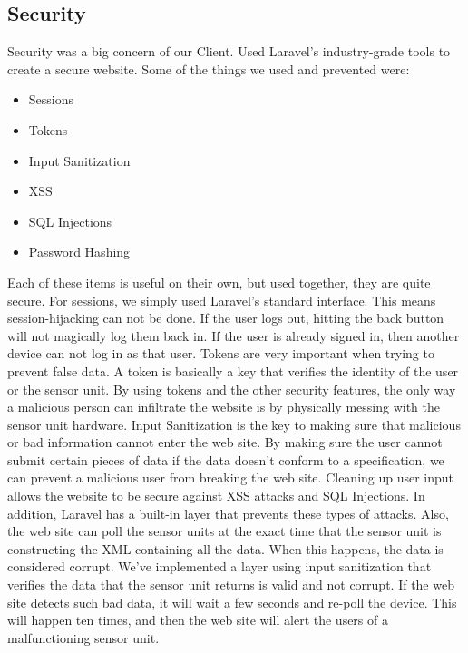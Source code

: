 \documentclass{report}
\begin{document}
\subsection*{Security}
\indent
\indent
Security was a big concern of our Client. Used Laravel's industry-grade tools to create a secure website. Some of the things we used and prevented were:
\begin{itemize}
	\item Sessions
	\item Tokens
	\item Input Sanitization
	\item XSS
	\item SQL Injections
	\item Password Hashing
\end{itemize}
\indent
Each of these items is useful on their own, but used together, they are quite secure.
\newline
\indent
For sessions, we simply used Laravel's standard interface. This means session-hijacking can not be done. If the user logs out, hitting the back button will not magically log them back in. If the user is already signed in, then another device can not log in as that user.
\newline
\indent
Tokens are very important when trying to prevent false data. A token is basically a key that verifies the identity of the user or the sensor unit. By using tokens and the other security features, the only way a malicious person can infiltrate the website is by physically messing with the sensor unit hardware.
\newline
\indent
Input Sanitization is the key to making sure that malicious or bad information cannot enter the web site. By making sure the user cannot submit certain pieces of data if the data doesn't conform to a specification, we can prevent a malicious user from breaking the web site. Cleaning up user input allows the website to be secure against XSS attacks and SQL Injections. In addition, Laravel has a built-in layer that prevents these types of attacks. Also, the web site can poll the sensor units at the exact time that the sensor unit is constructing the XML containing all the data. When this happens, the data is considered corrupt. We've implemented a layer using input sanitization that verifies the data that the sensor unit returns is valid and not corrupt. If the web site detects such bad data, it will wait a few seconds and re-poll the device. This will happen ten times, and then the web site will alert the users of a malfunctioning sensor unit.
\end{document}
